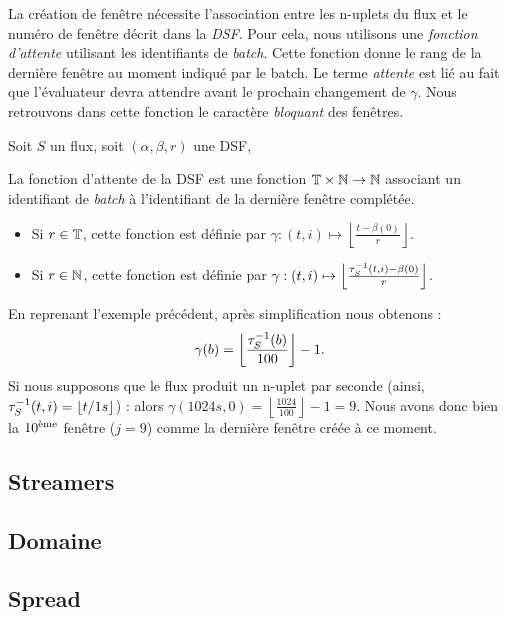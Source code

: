 La création de fenêtre nécessite l'association entre les n-uplets du flux et le numéro de fenêtre décrit dans la \textit{DSF}. Pour cela, nous utilisons une \textit{fonction d'attente} utilisant les identifiants de \textit{batch}. Cette fonction donne le rang de la dernière fenêtre au moment indiqué par le batch. Le terme \textit{attente} est lié au fait que l'évaluateur devra attendre avant le prochain changement de $\gamma$.
Nous retrouvons dans cette fonction le caractère \textit{bloquant} des fenêtres.
\begin{defi}
    Soit $S$ un flux, soit $(\alpha,\beta,r)$ une DSF,

    La fonction d'attente de la DSF est une fonction $\mathbb{T}\times\mathbb{N} \to \mathbb{N}$ associant un identifiant de \textit{batch} à l'identifiant de la dernière fenêtre complétée.
\begin{itemize}
 \item  Si $r\in\mathbb{T}$, cette fonction est définie par $\gamma : (t,i) \mapsto \left\lfloor \frac{t-\beta(0)}{r} \right\rfloor$.
 \item  Si $r\in\mathbb{N}$, cette fonction est définie par $\gamma : (t,i) \mapsto \left\lfloor \frac{\tau^{-1}_S(t,i)-\beta(0)}{r} \right\rfloor$.
\end{itemize}
\end{defi}
\begin{example}
    En reprenant l'exemple précédent, après simplification nous obtenons : $$\gamma(b) = \left\lfloor \frac{\tau^{-1}_S(b)}{100}\right\rfloor-1.$$
    Si nous supposons que le flux produit un n-uplet par seconde (ainsi, $\tau^{-1}_S(t,i) = \lfloor t/1s \rfloor$) : alors $\gamma(1024s,0) = \left\lfloor \frac{1024}{100}\right\rfloor-1 = 9$. Nous avons donc bien la $10^{\textrm{\`{e}me}}$ fenêtre ($j=9$) comme la dernière fenêtre créée à ce moment.
\end{example}

\subsection{Streamers}
\subsection{Domaine}
\subsection{Spread}